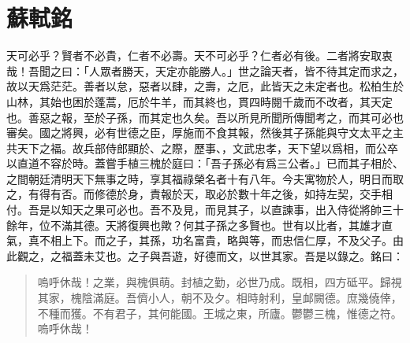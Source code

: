 \theendnotes

\section[三槐堂銘\quad{\small 蘇軾}]{{\normalsize 蘇軾}\quad {}銘}
天可必乎？賢者不必貴，仁者不必壽。天不可必乎？仁者必有後。二者將安取衷哉！吾聞之曰：「人{眾}者勝天，天定亦能勝人。」世之論天者，皆不待其定而求之，故以天爲茫茫。善者以怠，惡者以肆，之壽，之厄，此皆天之未定者也。松柏生於山林，其始也困於蓬蒿，厄於牛羊，而其終也，貫四時閱千歲而不改者，其天定也。善惡之報，至於子孫，而其定也久矣。吾以所見所聞所傳聞考之，而其可必也審矣。國之將興，必有世德之臣，厚施而不食其報，然後其子孫能與守文太平之主共天下之福。故兵部侍郎顯於、之際，歷事、，文武忠孝，天下望以爲相，而公卒以直道不容於時。蓋嘗手植三槐於庭曰：「吾子孫必有爲三公者。」已而其子相於、之間朝廷清明天下無事之時，享其福祿榮名者十有八年。今夫寓物於人，明日而取之，有得有否。而修德於身，責報於天，取必於數十年之後，如持左契，交手相付。吾是以知天之果可必也。吾不及見，而見其子，以直諫事，出入侍從將帥三十餘年，位不滿其德。天將復興也歟？何其子孫之多賢也。世有以比者，其雄才直氣，真不相上下。而之子，其孫，功名富貴，略與等，而忠{信}仁厚，不及父子。由此觀之，之福蓋未艾也。之子與吾遊，好德而文，以世其家。吾是以錄之。銘曰：%

\begin{quote}
    嗚呼休哉！之業，與槐俱萌。封植之勤，必世乃成。既相，四方砥平。歸視其家，槐陰滿庭。吾儕小人，朝不及夕。相時射利，皇䘏闕德。庶幾僥倖，不種而獲。不有君子，其何能國。王城之東，所廬。鬱鬱三槐，惟德之符。嗚呼休哉！
\end{quote}
\vspace{-1em}
\theendnotes

